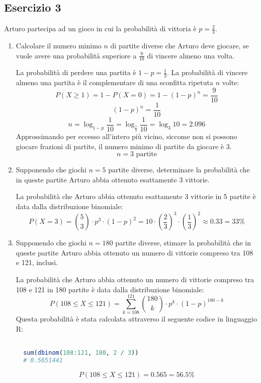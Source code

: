 \documentclass[a4paper]{article}
\theoremstyle{break}
\theoremstyle{break}
\theoremstyle{break}
\theoremstyle{break}
\begin{document}
\subsection{Esercizio 3}
Arturo partecipa ad un gioco in cui la probabilità di vittoria è \( p = \frac{2}{3} \).
\begin{enumerate}
	\item Calcolare il numero minimo \( n \) di partite diverse che Arturo deve giocare,
	      se vuole avere una probabilità superiore a \( \frac{9}{10} \) di vincere almeno una
	      volta.

	      \vspace{1em}
	      La probabilità di perdere una partita è \( 1 - p = \frac{1}{3} \). La probabilità
	      di vincere almeno una partita è il complementare di una sconfitta ripetuta \( n \)
	      volte:
	      \[
		      P(X \ge 1) = 1- P(X = 0) = 1 - (1 - p)^n = \frac{9}{10}
	      \]
	      \[
		      (1 - p)^n = \frac{1}{10}
	      \]
	      \[
		      n = \log_{1-p} \frac{1}{10} = \log_{\frac{1}{3}} \frac{1}{10} = \log_{3}10 = 2.096
	      \]
	      Approssimando per eccesso all'intero più vicino, siccome non si possono giocare
	      frazioni di partite, il numero minimo di partite da giocare è 3.
	      \[
		      n = 3 \text{ partite}
	      \]
	\item Supponendo che giochi \( n = 5 \) partite diverse, determinare la probabilità che
	      in queste partite Arturo abbia ottenuto esattamente 3 vittorie.

	      \vspace{1em}
	      La probabilità che Arturo abbia ottenuto esattamente 3 vittorie in 5 partite è data
	      dalla distribuzione binomiale:
	      \[
		      P(X = 3) = \binom{5}{3} \cdot p^3 \cdot (1-p)^2 =  10 \cdot \left( \frac{2}{3} \right)^3
		      \cdot \left( \frac{1}{3} \right)^2 \approx 0.33 = 33\%
	      \]
	\item Supponendo che giochi \( n = 180 \) partite diverse, stimare la probabilità che
	      in queste partite Arturo abbia ottenuto un numero di vittorie compreso tra 108 e 121,
	      inclusi.

	      \vspace{1em}
	      La probabilità che Arturo abbia ottenuto un numero di vittorie compreso tra 108 e 121
	      in 180 partite è data dalla distribuzione binomiale:
	      \[
		      P(108 \le X \le 121) = \sum_{k=108}^{121} \binom{180}{k} \cdot p^k \cdot (1-p)^{180-k}
	      \]
	      Questa probabilità è stata calcolata attraverso il seguente codice in linguaggio R:
	      \begin{lstlisting}[language=R]

  sum(dbinom(108:121, 180, 2 / 3)) 
  # 0.5651441
    \end{lstlisting}
	      \[
		      P(108 \le X \le 121) = 0.565 = 56.5\%
	      \]
\end{enumerate}
\end{document}
